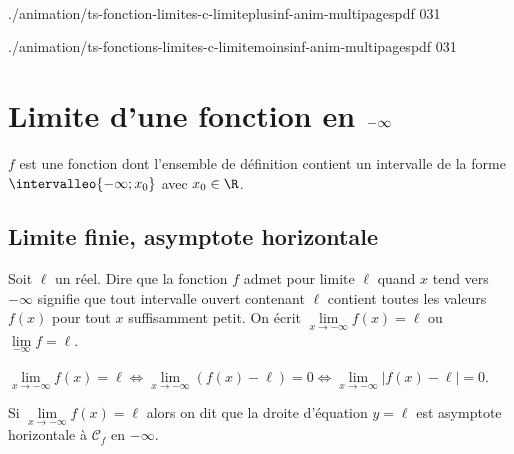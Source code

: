 \begin{intgr}~\newline
   \begin{minipage}{0.47\linewidth}%
%
	{./animation/ts-fonction-limites-c-limiteplusinf-anim-multipagespdf}%
	{0}{31}
   \end{minipage}
	\hfill
	\begin{minipage}{0.47\linewidth}%
%
	{./animation/ts-fonctions-limites-c-limitemoinsinf-anim-multipagespdf}%
	{0}{31}
   \end{minipage}
\end{intgr}

\section{Limite  d'une fonction en $\boldmath{-\infty}$}

\begin{centered}
$f$ est une fonction dont l'ensemble de définition contient un intervalle de la forme $\intervalleo{-\infty;x_0}$ avec $x_0\in\R$.
\end{centered}

\subsection{Limite finie, asymptote horizontale}

\begin{dfn}
Soit $\ell$ un réel.
Dire que la fonction $f$ admet pour limite $\ell$ quand $x$ tend vers $-\infty$ signifie que tout intervalle ouvert contenant $\ell$ contient toutes les valeurs $f(x)$ pour tout $x$ suffisamment petit.\newline
On écrit $\lim\limits_{x\to -\infty} f(x)=\ell$ ou $\lim\limits_{-\infty} f=\ell$.
\end{dfn}

\begin{prp}
$\lim\limits_{x\to -\infty}f(x)=\ell \Longleftrightarrow \lim\limits_{x\to -\infty}\left( f(x)-\ell\right)=0 \Longleftrightarrow \lim\limits_{x\to -\infty}\lvert f(x)-\ell\rvert=0$.
\end{prp}

\begin{dfn}
Si $\lim\limits_{x\to -\infty} f(x)=\ell$ alors on dit que la droite d'équation $y=\ell$ est asymptote horizontale à $\mathcal C_f$ en $-\infty$.
\end{dfn}



